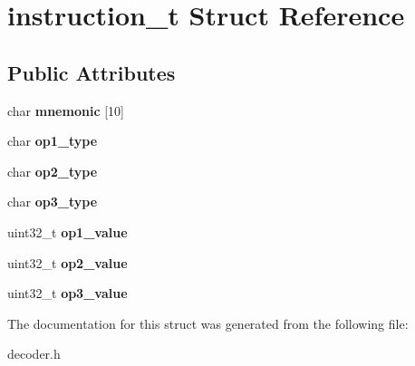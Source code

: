 \hypertarget{structinstruction__t}{}\section{instruction\+\_\+t Struct Reference}
\label{structinstruction__t}
\subsection*{Public Attributes}
\begin{DoxyCompactItemize}
\item 
\hypertarget{structinstruction__t_a21c70f3cc29824d5ea5f9ee20d244b2a}{}char {\bfseries mnemonic} \mbox{[}10\mbox{]}\label{structinstruction__t_a21c70f3cc29824d5ea5f9ee20d244b2a}

\item 
\hypertarget{structinstruction__t_aed69e0669a1e61f087a2c2c24125eff0}{}char {\bfseries op1\+\_\+type}\label{structinstruction__t_aed69e0669a1e61f087a2c2c24125eff0}

\item 
\hypertarget{structinstruction__t_a4d2fca7cc0ba4fd9791df9b180fd2c20}{}char {\bfseries op2\+\_\+type}\label{structinstruction__t_a4d2fca7cc0ba4fd9791df9b180fd2c20}

\item 
\hypertarget{structinstruction__t_acdf860d20e64a274dae5b473126ff245}{}char {\bfseries op3\+\_\+type}\label{structinstruction__t_acdf860d20e64a274dae5b473126ff245}

\item 
\hypertarget{structinstruction__t_a1e148ba27c8a2d1961416f858453c407}{}uint32\+\_\+t {\bfseries op1\+\_\+value}\label{structinstruction__t_a1e148ba27c8a2d1961416f858453c407}

\item 
\hypertarget{structinstruction__t_afa17be1ea5a72144032372faea594273}{}uint32\+\_\+t {\bfseries op2\+\_\+value}\label{structinstruction__t_afa17be1ea5a72144032372faea594273}

\item 
\hypertarget{structinstruction__t_afc117cadff4b36a90a01d7f268a6332a}{}uint32\+\_\+t {\bfseries op3\+\_\+value}\label{structinstruction__t_afc117cadff4b36a90a01d7f268a6332a}

\end{DoxyCompactItemize}


The documentation for this struct was generated from the following file\+:\begin{DoxyCompactItemize}
\item 
decoder.\+h\end{DoxyCompactItemize}

